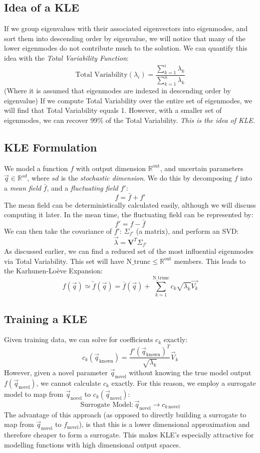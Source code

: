 \subsection{Idea of a KLE}
If we group eigenvalues with their associated eigenvectors into eigenmodes, and sort them into descending order by eigenvalue, we will notice that many of the lower eigenmodes do not contribute much to the solution.
We can quantify this idea with the \textit{Total Variability Function}:
$$
\text{Total Variability}(\lambda_i) = \frac
{\sum_{k=1}^{i} \lambda_k}
{\sum_{k=1}^{n} \lambda_k}
$$
(Where it is assumed that eigenmodes are indexed in descending order by eigenvalue) If we compute Total Variability over the entire set of eigenmodes, we will find that Total Variability equals 1.
However, with a smaller set of eigenmodes, we can recover 99\% of the Total Variability.
\textit{This is the idea of KLE.}

\subsection{KLE Formulation}
We model a function $f$ with output dimension $\mathbb{R}^{\text{out}}$, and uncertain parameters $\vec{q} \in \mathbb{R}^{sd}$, where $sd$ is the \textit{stochastic dimension}. 
We do this by decomposing $f$ into a \textit{mean field} $\bar{f}$, and a \textit{fluctuating field} $f'$:
$$
f = \bar{f} + f'
$$
The mean field can be deterministically calculated easily, although we will discuss computing it later.
In the mean time, the fluctuating field can be represented by:
$$
f' = f - \bar{f}
$$
We can then take the covariance of $f'$: $\Sigma_{f'}$ (a matrix), and perform an SVD:
$$
\vec{\lambda} = \mathbf{V}^T \Sigma_{f'}
$$
As discussed earlier, we can find a reduced set of the most influential eigenmodes via Total Variability.
This set will have $\text{N\_trunc} \le \mathbb{R}^{\text{out}}$ members.
This leads to the Karhunen-Loève Expansion:
$$
f(\vec{q}) \simeq \tilde{f}(\vec{q}) = \bar{f}(\vec{q}) + \sum_{k=1}^{\text{N\_trunc}} c_k \sqrt{\lambda_k} \vec{V_k}
$$
\subsection{Training a KLE}
Given training data, we can solve for coefficients $c_k$ exactly:
$$
c_k(\vec{q}_{\text{known}}) = \frac
{f'(\vec{q}_{\text{known}})^T}
{\sqrt{\lambda_k}} \vec{V}_k
$$
However, given a novel parameter $\vec{q}_{\text{novel}}$ without knowing the true model output $f(\vec{q}_{\text{novel}})$, we cannot calculate $c_k$ exactly.
For this reason, we employ a surrogate model to map from $\vec{q}_{\text{novel}}$ to $c_k(\vec{q}_{\text{novel}})$:
$$
\text{Surrogate Model}: \vec{q}_{\text{novel}} \rightarrow c_{k\,\text{novel}}
$$
The advantage of this approach (as opposed to directly building a surrogate to map from $\vec{q}_{\text{novel}}$ to $f_{\text{novel}}$), is that this is a lower dimensional approximation and therefore cheaper to form a surrogate. This makes KLE's especially attractive for modelling functions with high dimensional output spaces.


